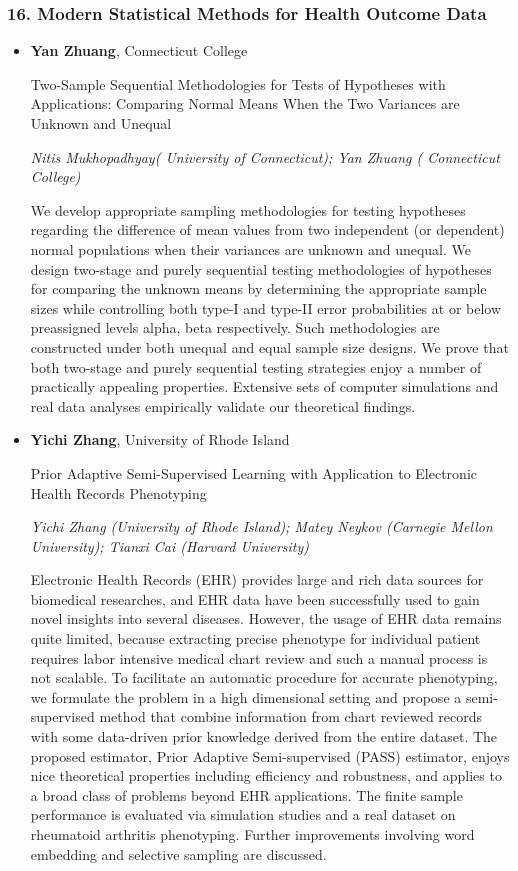 \subsubsection*{16. Modern Statistical Methods for Health Outcome Data}

\begin{itemize}
\item \textbf{Yan Zhuang}, Connecticut College

Two-Sample Sequential Methodologies for Tests of Hypotheses with Applications: Comparing Normal Means When the Two Variances are Unknown and Unequal

\emph{\footnotesize Nitis Mukhopadhyay( University of Connecticut); Yan Zhuang ( Connecticut College)}

We develop appropriate sampling methodologies for testing hypotheses regarding the difference of mean values from two independent (or dependent) normal populations when their variances are unknown and unequal. We design two-stage and purely sequential testing methodologies of hypotheses for comparing the unknown means by determining the appropriate sample sizes while controlling both type-I and type-II error probabilities at or below preassigned levels alpha, beta respectively. Such methodologies are constructed under both unequal and equal sample size designs. We prove that both two-stage and purely sequential testing strategies enjoy a number of practically appealing properties. Extensive sets of computer simulations and real data analyses empirically validate our theoretical findings.

\item \textbf{Yichi Zhang}, University of Rhode Island

Prior Adaptive Semi-Supervised Learning with Application to Electronic Health Records Phenotyping

\emph{\footnotesize Yichi Zhang (University of Rhode Island); Matey Neykov (Carnegie Mellon University); Tianxi Cai (Harvard University)}

Electronic Health Records (EHR) provides large and rich data sources for biomedical researches, and EHR data have been successfully used to gain novel insights into several diseases. However, the usage of EHR data remains quite limited,  because extracting precise phenotype for individual patient requires labor intensive medical chart review and such a manual process is not scalable. To facilitate an automatic procedure for accurate phenotyping, we formulate the problem in a high dimensional setting and propose a semi-supervised method that combine information from chart reviewed records with some data-driven prior knowledge derived from the entire dataset. The proposed estimator, Prior Adaptive Semi-supervised (PASS) estimator, enjoys nice theoretical properties including efficiency and robustness, and applies to a broad class of problems beyond EHR applications. The finite sample performance is evaluated via simulation studies and a real dataset on rheumatoid arthritis phenotyping. Further improvements involving word embedding and selective sampling are discussed.


\end{itemize}
